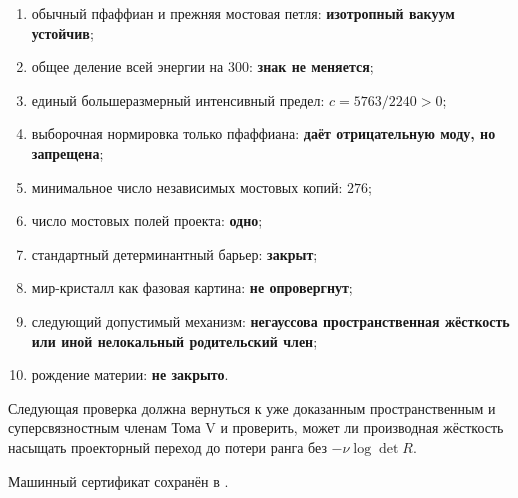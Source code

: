 \begin{protocol}
\begin{enumerate}
 \item обычный пфаффиан и прежняя мостовая петля:
 \textbf{изотропный вакуум устойчив};
 \item общее деление всей энергии на $300$:
 \textbf{знак не меняется};
 \item единый большеразмерный интенсивный предел:
 \textbf{$c=5763/2240>0$};
 \item выборочная нормировка только пфаффиана:
 \textbf{даёт отрицательную моду, но запрещена};
 \item минимальное число независимых мостовых копий:
 \textbf{$276$};
 \item число мостовых полей проекта:
 \textbf{одно};
 \item стандартный детерминантный барьер:
 \textbf{закрыт};
 \item мир-кристалл как фазовая картина:
 \textbf{не опровергнут};
 \item следующий допустимый механизм:
 \textbf{негауссова пространственная жёсткость или иной нелокальный
 родительский член};
 \item рождение материи:
 \textbf{не закрыто}.
\end{enumerate}
\end{protocol}

Следующая проверка должна вернуться к уже доказанным пространственным и
суперсвязностным членам Тома V и проверить, может ли производная
жёсткость насыщать проекторный переход до потери ранга без
$-\nu\log\det R$.

Машинный сертификат сохранён в
.